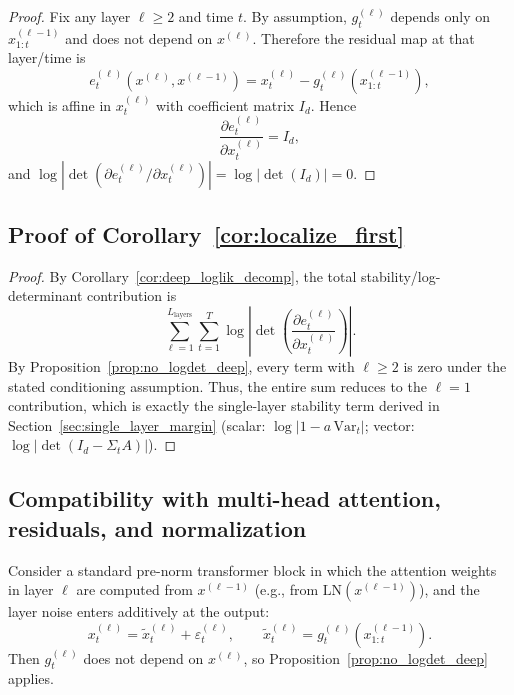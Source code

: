 \documentclass[11pt]{article}
\begin{document}
\begin{proof}
Fix any layer $\ell\ge 2$ and time $t$.
By assumption, $g^{(\ell)}_t$ depends only on $x^{(\ell-1)}_{1:t}$ and does not depend on $x^{(\ell)}$.
Therefore the residual map at that layer/time is
\[
e^{(\ell)}_t(x^{(\ell)},x^{(\ell-1)}) = x^{(\ell)}_t - g^{(\ell)}_t(x^{(\ell-1)}_{1:t}),
\]
which is affine in $x^{(\ell)}_t$ with coefficient matrix $I_d$.
Hence
\[
\frac{\partial e^{(\ell)}_t}{\partial x^{(\ell)}_t} = I_d,
\]
and $\log\left|\det(\partial e^{(\ell)}_t/\partial x^{(\ell)}_t)\right|=\log|\det(I_d)|=0$.
\end{proof}

\subsection{Proof of Corollary~\ref{cor:localize_first}}
\label{app:proof_localize_first}

\begin{proof}
By Corollary~\ref{cor:deep_loglik_decomp}, the total stability/log-determinant contribution is
\[
\sum_{\ell=1}^{L_{\mathrm{layers}}}\sum_{t=1}^T
\log\left|\det\!\left(\frac{\partial e^{(\ell)}_t}{\partial x^{(\ell)}_t}\right)\right|.
\]
By Proposition~\ref{prop:no_logdet_deep}, every term with $\ell\ge 2$ is zero under the stated conditioning assumption.
Thus, the entire sum reduces to the $\ell=1$ contribution, which is exactly the single-layer stability term
derived in Section~\ref{sec:single_layer_margin} (scalar: $\log|1-a\,\mathrm{Var}_t|$; vector: $\log|\det(I_d-\Sigma_tA)|$).
\end{proof}

\subsection{Compatibility with multi-head attention, residuals, and normalization}
\label{app:proof_mha_residual_ln}

\begin{lemma}
\label{lem:block_satisfies_conditioning}
Consider a standard pre-norm transformer block in which the attention weights in layer $\ell$ are computed
from $x^{(\ell-1)}$ (e.g., from $\mathrm{LN}(x^{(\ell-1)})$), and the layer noise enters additively at the
output:
\[
x^{(\ell)}_t = \tilde{x}^{(\ell)}_t + \varepsilon^{(\ell)}_t,
\qquad
\tilde{x}^{(\ell)}_t = g^{(\ell)}_t(x^{(\ell-1)}_{1:t}).
\]
Then $g^{(\ell)}_t$ does not depend on $x^{(\ell)}$, so Proposition~\ref{prop:no_logdet_deep} applies.
\end{lemma}
\end{document}
